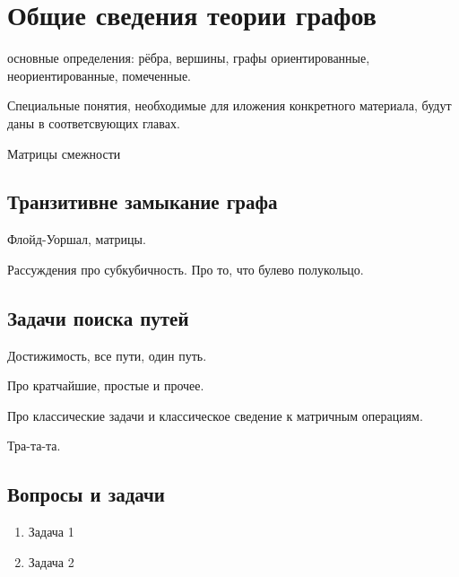\section{Общие сведения теории графов}

основные определения: рёбра, вершины, графы ориентированные, неориентированные, помеченные.

Специальные понятия, необходимые для иложения конкретного материала, будут даны в соответсвующих главах.

Матрицы смежности

\subsection{Транзитивне замыкание графа}

Флойд-Уоршал, матрицы.

Рассуждения про субкубичность.
Про то, что булево полукольцо.


\subsection{Задачи поиска путей}

Достижимость, все пути, один путь.

Про кратчайшие, простые и прочее.

Про классические задачи и классическое сведение к матричным операциям.

Тра-та-та.

\subsection{Вопросы и задачи}
\begin{enumerate}
  \item Задача 1
  \item Задача 2
\end{enumerate}
